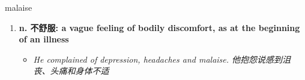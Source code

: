 
\begin{frame}
{\huge malaise}
\begin{center}
\begin{enumerate}\Large
  \item \textbf{n. 不舒服: a vague feeling of bodily discomfort, as at the beginning of an illness}
  \begin{itemize}
    \item \em{\Large{He complained of depression, headaches and malaise. 他抱怨说感到沮丧、头痛和身体不适}}
  \end{itemize}
\end{enumerate}
\end{center}
\end{frame}
